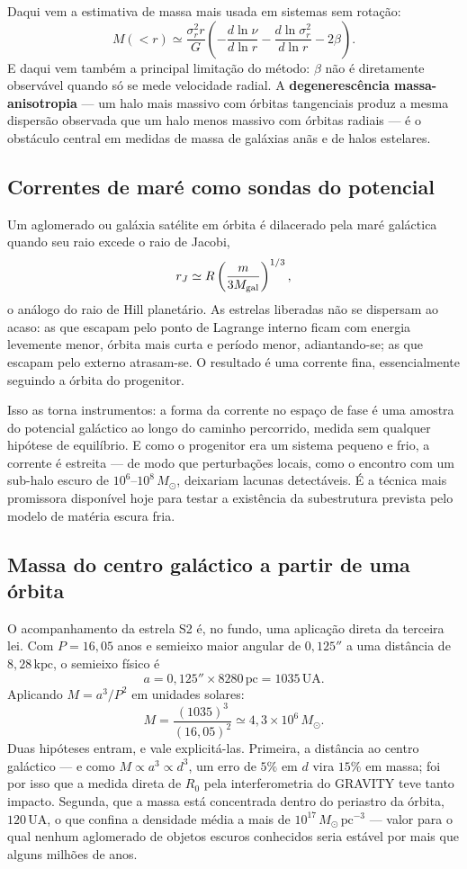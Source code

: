 \documentclass[11pt,a4paper]{article}
\begin{document}
Daqui vem a estimativa de massa mais usada em sistemas sem rotação:
\[
M(<r)\simeq\frac{\sigma_r^{2}r}{G}\left(-\frac{d\ln\nu}{d\ln r}-\frac{d\ln\sigma_r^{2}}{d\ln r}-2\beta\right).
\]
E daqui vem também a principal limitação do método: $\beta$ não é diretamente observável quando só se mede velocidade radial. A \textbf{degenerescência massa-anisotropia} --- um halo mais massivo com órbitas tangenciais produz a mesma dispersão observada que um halo menos massivo com órbitas radiais --- é o obstáculo central em medidas de massa de galáxias anãs e de halos estelares.

\subsection*{Correntes de maré como sondas do potencial}

Um aglomerado ou galáxia satélite em órbita é dilacerado pela maré galáctica quando seu raio excede o raio de Jacobi,
\[
r_J\simeq R\left(\frac{m}{3M_{\rm gal}}\right)^{1/3},
\]
o análogo do raio de Hill planetário. As estrelas liberadas não se dispersam ao acaso: as que escapam pelo ponto de Lagrange interno ficam com energia levemente menor, órbita mais curta e período menor, adiantando-se; as que escapam pelo externo atrasam-se. O resultado é uma corrente fina, essencialmente seguindo a órbita do progenitor.

Isso as torna instrumentos: a forma da corrente no espaço de fase é uma amostra do potencial galáctico ao longo do caminho percorrido, medida sem qualquer hipótese de equilíbrio. E como o progenitor era um sistema pequeno e frio, a corrente é estreita --- de modo que perturbações locais, como o encontro com um sub-halo escuro de $10^{6}$--$10^{8}\,M_\odot$, deixariam lacunas detectáveis. É a técnica mais promissora disponível hoje para testar a existência da subestrutura prevista pelo modelo de matéria escura fria.

\subsection*{Massa do centro galáctico a partir de uma órbita}

O acompanhamento da estrela S2 é, no fundo, uma aplicação direta da terceira lei. Com $P=16{,}05$ anos e semieixo maior angular de $0{,}125''$ a uma distância de $8{,}28\,\mathrm{kpc}$, o semieixo físico é
\[
a=0{,}125''\times8280\,\mathrm{pc}=1035\,\mathrm{UA}.
\]
Aplicando $M=a^{3}/P^{2}$ em unidades solares:
\[
M=\frac{(1035)^{3}}{(16{,}05)^{2}}\simeq4{,}3\times10^{6}\,M_\odot.
\]
Duas hipóteses entram, e vale explicitá-las. Primeira, a distância ao centro galáctico --- e como $M\propto a^{3}\propto d^{3}$, um erro de $5\%$ em $d$ vira $15\%$ em massa; foi por isso que a medida direta de $R_0$ pela interferometria do GRAVITY teve tanto impacto. Segunda, que a massa está concentrada dentro do periastro da órbita, $120\,\mathrm{UA}$, o que confina a densidade média a mais de $10^{17}\,M_\odot\,\mathrm{pc^{-3}}$ --- valor para o qual nenhum aglomerado de objetos escuros conhecidos seria estável por mais que alguns milhões de anos.
\end{document}
